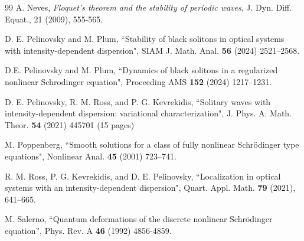 \documentclass[12pt,reqno]{amsart}
\numberwithin{equation}{section}
\numberwithin{figure}{section}
\begin{document}
\begin{thebibliography}{99}
 A. Neves, \textit{Floquet's theorem and the stability of periodic waves}, J. Dyn. Diff. Equat., 21 (2009), 555-565.
		
 D. E. Pelinovsky and M. Plum, ``Stability of black solitons in optical systems with intensity-dependent dispersion", SIAM J. Math. Anal. {\bf 56} (2024) 2521--2568.

 D.E. Pelinovsky and M. Plum, ``Dynamics of black solitons in a regularized nonlinear Schrodinger equation", Proceeding AMS {\bf 152} (2024) 1217--1231.
		
 D. E. Pelinovsky, R. M. Ross, and P. G. Kevrekidis, 
``Solitary waves with intensity-dependent dispersion: variational characterization", J. Phys. A: Math. Theor. {\bf 54} (2021) 445701 (15 pages) 	

 M. Poppenberg, ``Smooth solutions for a class of fully nonlinear Schr\"{o}dinger type equations", Nonlinear Anal. {\bf 45} (2001) 723--741.
	

 R. M. Ross, P. G. Kevrekidis, and D. E. Pelinovsky, 
``Localization in optical systems with an intensity-dependent dispersion", 
Quart. Appl. Math. {\bf 79} (2021), 641--665.
		
 M. Salerno,
``Quantum deformations of the discrete nonlinear Schr{\"o}dinger equation'',
Phys. Rev. A {\bf 46} (1992) 4856-4859.			
	
			
		
	\end{thebibliography}
	
	
   
\end{document}
